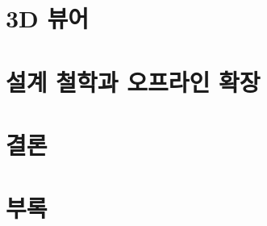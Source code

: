 \documentclass[11pt,oneside]{book}
\begin{document}
\part{3D 뷰어}


\part{설계 철학과 오프라인 확장}


\part{결론}


\appendix
\part{부록}

\end{document}

